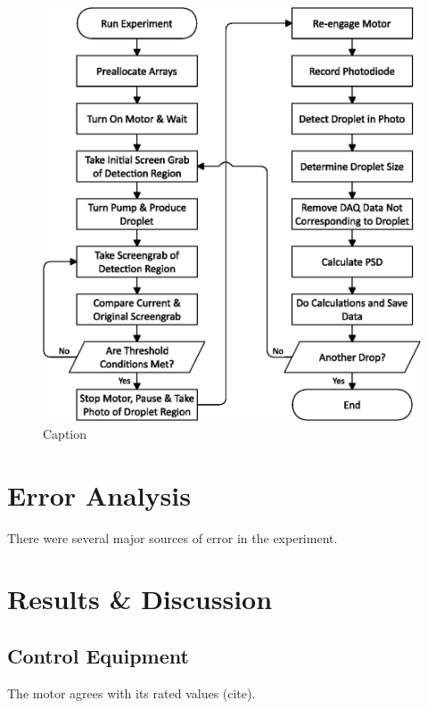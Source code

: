 \documentclass{physics_article_B}
\begin{document}
        \newpage
        \begin{figure}[H]
            \centering
            \hspace*{-1cm}\includegraphics[scale=0.8]{Figures/FlowLogic.eps}
            \caption{Caption}
            \label{fig:setup:logic}
        \end{figure}

\section{Error Analysis} 
    
    There were several major sources of error in the experiment.
    
\section{Results \& Discussion}
    
    \subsection{Control Equipment}
    
        The motor agrees with its rated values (cite).
    
\end{document}
